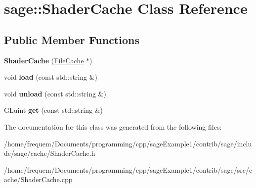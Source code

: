 \hypertarget{classsage_1_1ShaderCache}{}\section{sage\+::Shader\+Cache Class Reference}
\label{classsage_1_1ShaderCache}
\subsection*{Public Member Functions}
\begin{DoxyCompactItemize}
\item 
\mbox{\label{classsage_1_1ShaderCache_a9977d4b3bae3c36778d0a6f0fd73bc2e}} 
{\bfseries Shader\+Cache} (\mbox{\hyperlink{classsage_1_1FileCache}{File\+Cache}} $\ast$)
\item 
\mbox{\label{classsage_1_1ShaderCache_a3354d3c69b77ef0f1221ef8a0571826b}} 
void {\bfseries load} (const std\+::string \&)
\item 
\mbox{\label{classsage_1_1ShaderCache_ab305b4c76870619524a6236899327ad6}} 
void {\bfseries unload} (const std\+::string \&)
\item 
\mbox{\label{classsage_1_1ShaderCache_aafc93b46c5a0416653424ee0b60b8aae}} 
G\+Luint {\bfseries get} (const std\+::string \&)
\end{DoxyCompactItemize}


The documentation for this class was generated from the following files\+:\begin{DoxyCompactItemize}
\item 
/home/frequem/\+Documents/programming/cpp/sage\+Example1/contrib/sage/include/sage/cache/Shader\+Cache.\+h\item 
/home/frequem/\+Documents/programming/cpp/sage\+Example1/contrib/sage/src/cache/Shader\+Cache.\+cpp\end{DoxyCompactItemize}
